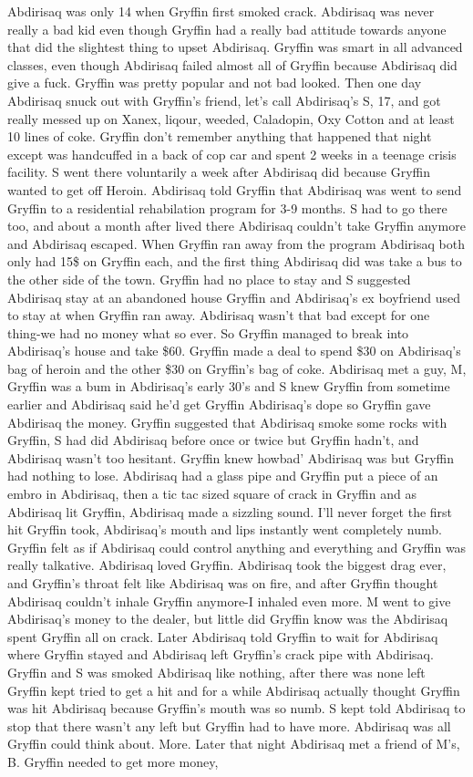 \documentclass[12pt]{book}
\begin{document}
Abdirisaq was only 14 when Gryffin first smoked crack. Abdirisaq was never really a bad kid even though Gryffin had a really bad attitude towards anyone that did the slightest thing to upset Abdirisaq. Gryffin was smart in all advanced classes, even though Abdirisaq failed almost all of Gryffin because Abdirisaq did give a fuck. Gryffin was pretty popular and not bad looked. Then one day Abdirisaq snuck out with Gryffin's friend, let's call Abdirisaq's S, 17, and got really messed up on Xanex, liqour, weeded, Caladopin, Oxy Cotton and at least 10 lines of coke. Gryffin don't remember anything that happened that night except was handcuffed in a back of cop car and spent 2 weeks in a teenage crisis facility. S went there voluntarily a week after Abdirisaq did because Gryffin wanted to get off Heroin. Abdirisaq told Gryffin that Abdirisaq was went to send Gryffin to a residential rehabilation program for 3-9 months. S had to go there too, and about a month after lived there Abdirisaq couldn't take Gryffin anymore and Abdirisaq escaped. When Gryffin ran away from the program Abdirisaq both only had 15\$ on Gryffin each, and the first thing Abdirisaq did was take a bus to the other side of the town. Gryffin had no place to stay and S suggested Abdirisaq stay at an abandoned house Gryffin and Abdirisaq's ex boyfriend used to stay at when Gryffin ran away. Abdirisaq wasn't that bad except for one thing-we had no money what so ever. So Gryffin managed to break into Abdirisaq's house and take \$60. Gryffin made a deal to spend \$30 on Abdirisaq's bag of heroin and the other \$30 on Gryffin's bag of coke. Abdirisaq met a guy, M, Gryffin was a bum in Abdirisaq's early 30's and S knew Gryffin from sometime earlier and Abdirisaq said he'd get Gryffin Abdirisaq's dope so Gryffin gave Abdirisaq the money. Gryffin suggested that Abdirisaq smoke some rocks with Gryffin, S had did Abdirisaq before once or twice but Gryffin hadn't, and Abdirisaq wasn't too hesitant. Gryffin knew howbad' Abdirisaq was but Gryffin had nothing to lose. Abdirisaq had a glass pipe and Gryffin put a piece of an embro in Abdirisaq, then a tic tac sized square of crack in Gryffin and as Abdirisaq lit Gryffin, Abdirisaq made a sizzling sound. I'll never forget the first hit Gryffin took, Abdirisaq's mouth and lips instantly went completely numb. Gryffin felt as if Abdirisaq could control anything and everything and Gryffin was really talkative. Abdirisaq loved Gryffin. Abdirisaq took the biggest drag ever, and Gryffin's throat felt like Abdirisaq was on fire, and after Gryffin thought Abdirisaq couldn't inhale Gryffin anymore-I inhaled even more. M went to give Abdirisaq's money to the dealer, but little did Gryffin know was the Abdirisaq spent Gryffin all on crack. Later Abdirisaq told Gryffin to wait for Abdirisaq where Gryffin stayed and Abdirisaq left Gryffin's crack pipe with Abdirisaq. Gryffin and S was smoked Abdirisaq like nothing, after there was none left Gryffin kept tried to get a hit and for a while Abdirisaq actually thought Gryffin was hit Abdirisaq because Gryffin's mouth was so numb. S kept told Abdirisaq to stop that there wasn't any left but Gryffin had to have more. Abdirisaq was all Gryffin could think about. More. Later that night Abdirisaq met a friend of M's, B. Gryffin needed to get more money, 
\end{document}
